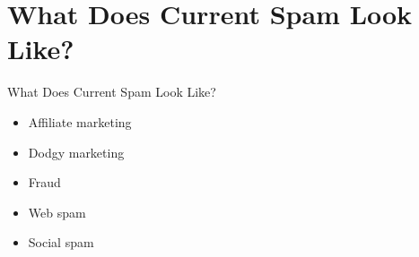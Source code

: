 \documentclass[nobackground,dvipsnames,table]{beamer}
\begin{document}
\section{What Does Current Spam Look Like?}

\begin{frame}{What Does Current Spam Look Like?}
    \begin{itemize}
        \item Affiliate marketing
        \item Dodgy marketing
        \item Fraud
        \item Web spam
        \item Social spam
    \end{itemize}
\end{frame}
\end{document}
